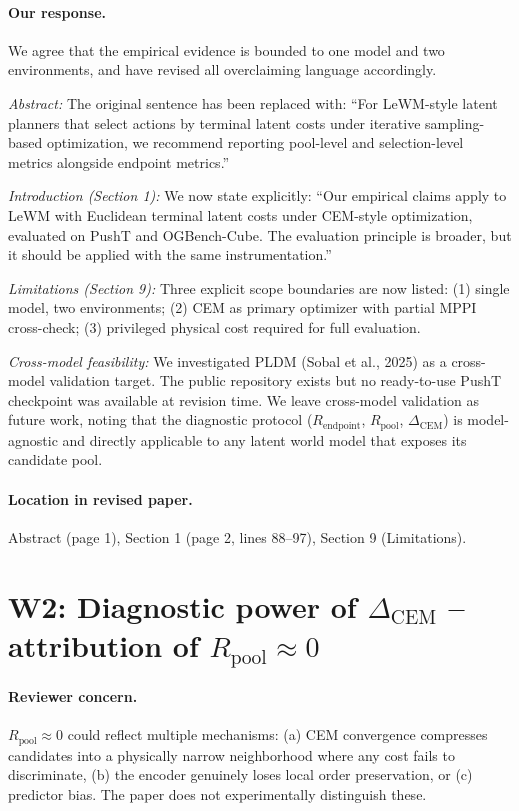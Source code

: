 \documentclass[11pt]{article}
\newcommand{\Rendpoint}{R_{\mathrm{endpoint}}}
\newcommand{\Rpool}{R_{\mathrm{pool}}}
\newcommand{\DeltaCEM}{\Delta_{\mathrm{CEM}}}
\begin{document}
\paragraph{Our response.}
We agree that the empirical evidence is bounded to one model and two environments, and have revised all overclaiming language accordingly.

\textit{Abstract:} The original sentence has been replaced with: ``For LeWM-style latent planners that select actions by terminal latent costs under iterative sampling-based optimization, we recommend reporting pool-level and selection-level metrics alongside endpoint metrics.''

\textit{Introduction (Section 1):} We now state explicitly: ``Our empirical claims apply to LeWM with Euclidean terminal latent costs under CEM-style optimization, evaluated on PushT and OGBench-Cube. The evaluation principle is broader, but it should be applied with the same instrumentation.''

\textit{Limitations (Section 9):} Three explicit scope boundaries are now listed: (1) single model, two environments; (2) CEM as primary optimizer with partial MPPI cross-check; (3) privileged physical cost required for full evaluation.

\textit{Cross-model feasibility:} We investigated PLDM (Sobal et al., 2025) as a cross-model validation target. The public repository exists but no ready-to-use PushT checkpoint was available at revision time. We leave cross-model validation as future work, noting that the diagnostic protocol ($\Rendpoint$, $\Rpool$, $\DeltaCEM$) is model-agnostic and directly applicable to any latent world model that exposes its candidate pool.

\paragraph{Location in revised paper.}
Abstract (page 1), Section 1 (page 2, lines 88--97), Section 9 (Limitations).

\section*{W2: Diagnostic power of $\DeltaCEM$ -- attribution of $\Rpool \approx 0$}

\paragraph{Reviewer concern.}
$\Rpool \approx 0$ could reflect multiple mechanisms: (a) CEM convergence compresses candidates into a physically narrow neighborhood where any cost fails to discriminate, (b) the encoder genuinely loses local order preservation, or (c) predictor bias. The paper does not experimentally distinguish these.
\end{document}
